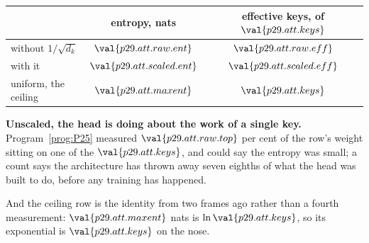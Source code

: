 \begin{fr}

\begin{center}
\begin{tabular}{lcc}
\toprule
 & entropy, nats & effective keys, of $\val{p29.att.keys}$ \\
\midrule
without $1/\sqrt{d_k}$ & $\val{p29.att.raw.ent}$
  & $\val{p29.att.raw.eff}$ \\
with it & $\val{p29.att.scaled.ent}$
  & $\val{p29.att.scaled.eff}$ \\
\midrule
uniform, the ceiling & $\val{p29.att.maxent}$
  & $\val{p29.att.keys}$ \\
\bottomrule
\end{tabular}
\end{center}

\textbf{Unscaled, the head is doing about the work of a single key.}
Program~\ref{prog:P25} measured $\val{p29.att.raw.top}$ per cent of the row's
weight sitting on one of the $\val{p29.att.keys}$, and could say the entropy
was small; a count says the
architecture has thrown away seven eighths of what the head was built to do,
before any training has happened.

And the ceiling row is the identity from two frames ago rather than a fourth
measurement: $\val{p29.att.maxent}$ nats is $\ln \val{p29.att.keys}$, so its
exponential is $\val{p29.att.keys}$ on the nose.
\end{fr}

